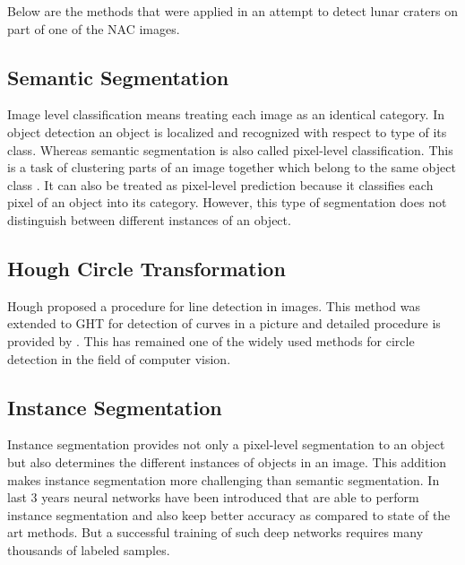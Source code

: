 \documentclass[11pt]{article}
\begin{document}
Below are the methods that were applied in an attempt to detect lunar craters on part of one of the NAC images. 

\subsection{Semantic Segmentation}
Image level classification means treating each image as an identical category. In object detection an object is localized and recognized with respect to type of its class. Whereas semantic segmentation is also called pixel-level classification. This is a task of clustering parts of an image together which belong to the same object class \cite{thoma2016survey}. It can also be treated as pixel-level prediction because it classifies each pixel of an object into its category. However, this type of segmentation does not distinguish between different instances of an object.

\subsection{Hough Circle Transformation}
Hough proposed a procedure for line detection in images. This method was extended to GHT for detection of curves in a picture and detailed procedure is provided by \cite{duda1972use}. This has remained one of the widely used methods for circle detection in the field of computer vision.

\subsection{Instance Segmentation}
Instance segmentation provides not only a pixel-level segmentation to an object but also determines the different instances of objects in an image. This addition makes instance segmentation more challenging than semantic segmentation. In last 3 years neural networks have been introduced that are able to perform instance segmentation and also keep better accuracy as compared to state of the art methods. But a successful training of such deep networks requires many thousands of labeled samples. 
\end{document}
